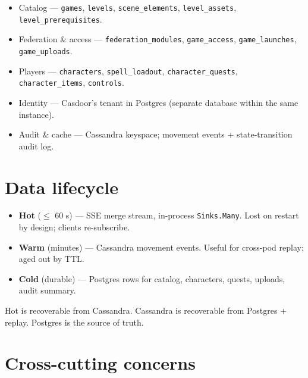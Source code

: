 \documentclass[11pt,a4paper,openany]{book}
\begin{document}
\begin{itemize}
  \item Catalog --- \texttt{games}, \texttt{levels},
        \texttt{scene\_elements}, \texttt{level\_assets},
        \texttt{level\_prerequisites}.
  \item Federation \& access --- \texttt{federation\_modules},
        \texttt{game\_access}, \texttt{game\_launches},
        \texttt{game\_uploads}.
  \item Players --- \texttt{characters}, \texttt{spell\_loadout},
        \texttt{character\_quests}, \texttt{character\_items},
        \texttt{controls}.
  \item Identity --- Casdoor's tenant in Postgres (separate database
        within the same instance).
  \item Audit \& cache --- Cassandra keyspace; movement events +
        state-transition audit log.
\end{itemize}

\chapter{Data lifecycle}
\begin{itemize}
  \item \textbf{Hot} ($\le$ 60 s) --- SSE merge stream, in-process
        \texttt{Sinks.Many}. Lost on restart by design; clients
        re-subscribe.
  \item \textbf{Warm} (minutes) --- Cassandra movement events. Useful
        for cross-pod replay; aged out by TTL.
  \item \textbf{Cold} (durable) --- Postgres rows for catalog,
        characters, quests, uploads, audit summary.
\end{itemize}

Hot is recoverable from Cassandra. Cassandra is recoverable from
Postgres + replay. Postgres is the source of truth.

\chapter{Cross-cutting concerns}
\end{document}
